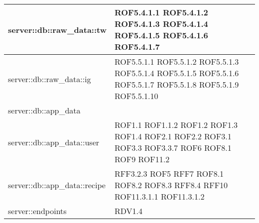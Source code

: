 \begin{center}
\begin{longtable}{| p{9cm} | p{4cm} |}
\hline
server::db::raw\_data::tw  & ROF5.4.1.1 \newline ROF5.4.1.2 \newline ROF5.4.1.3 \newline ROF5.4.1.4 \newline ROF5.4.1.5 \newline ROF5.4.1.6  \newline ROF5.4.1.7 \\
\hline
server::db::raw\_data::ig  & ROF5.5.1.1 \newline ROF5.5.1.2 \newline ROF5.5.1.3 \newline ROF5.5.1.4 \newline ROF5.5.1.5 \newline ROF5.5.1.6  \newline ROF5.5.1.7 \newline ROF5.5.1.8 \newline ROF5.5.1.9 \newline ROF5.5.1.10 \\
\hline
server::db::app\_data  &   \\
\hline
server::db::app\_data::user  &  ROF1.1 \newline ROF1.1.2 \newline ROF1.2 \newline ROF1.3 \newline ROF1.4 \newline ROF2.1 \newline ROF2.2 \newline ROF3.1 \newline ROF3.3 \newline ROF3.3.7 \newline ROF6 \newline ROF8.1 \newline ROF9 \newline ROF11.2 \\
\hline
server::db::app\_data::recipe &  RFF3.2.3 \newline ROF5 \newline RFF7 \newline ROF8.1 \newline ROF8.2 \newline ROF8.3 \newline RFF8.4 \newline RFF10 \newline ROF11.3.1.1 \newline ROF11.3.1.2 \\
\hline
server::endpoints  &  RDV1.4 \\

\end{longtable}
\end{center}

